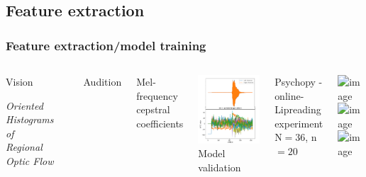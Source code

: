 \documentclass{beamer}
\begin{document}
\subsection{Feature extraction}

\begin{frame}
\frametitle{Feature extraction/model training}
\begin{columns}
\begin{center}
Vision\\
\begin{tiny}
\textit{Oriented Histograms of Regional Optic Flow}
\end{tiny}
\end{center}
\begin{center}
\end{center}
Audition\\
\begin{tiny}
Mel-frequency cepstral coefficients
\end{tiny}
\includegraphics[width=.8\textwidth]{images/MFCC}
Model validation
\begin{tiny}
Psychopy -online-\\ Lipreading experiment \\N$=36$, n$=20$
\end{tiny}
\includegraphics<1>[width=\textwidth]{images/exp}
\includegraphics<2>[width=\textwidth]{images/matriz_confus}
\includegraphics<2>[width=\textwidth]{images/corr_confus}
\end{columns}
\begin{tiny}
\begin{center}
\cite{BasuMallick2015, Viola, Kazemi2014, Liu2016, Gold2011, Hoffman2014}
\end{center}
\end{tiny}
\end{frame}
\end{document}
